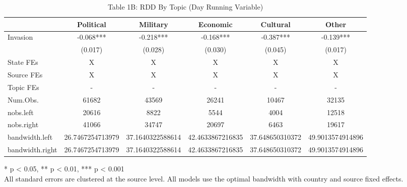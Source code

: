 \begin{table}[!t]
\caption{Table 1B: RDD By Topic (Day Running Variable)} 
\fontsize{12.0pt}{14.4pt}\selectfont
\begin{tabular*}{\linewidth}{@{\extracolsep{\fill}}lccccc}
\toprule
  & Political & Military & Economic & Cultural & Other \\ 
\midrule\addlinespace[2.5pt]
Invasion & -0.068*** & -0.218*** & -0.168*** & -0.387*** & -0.139*** \\ 
{} & {(0.017)} & {(0.028)} & {(0.030)} & {(0.045)} & {(0.017)} \\ 
State FEs & X & X & X & X & X \\ 
Source FEs & X & X & X & X & X \\ 
Topic FEs & - & - & - & - & - \\ 
Num.Obs. & 61682 & 43569 & 26241 & 10467 & 32135 \\ 
nobs.left & 20616 & 8822 & 5544 & 4004 & 12518 \\ 
nobs.right & 41066 & 34747 & 20697 & 6463 & 19617 \\ 
bandwidth.left & 26.7467254713979 & 37.1640322588614 & 42.4633867216835 & 37.648650310372 & 49.9013574914896 \\ 
bandwidth.right & 26.7467254713979 & 37.1640322588614 & 42.4633867216835 & 37.648650310372 & 49.9013574914896 \\ 
\bottomrule
\end{tabular*}
\begin{minipage}{\linewidth}
* p < 0.05, ** p < 0.01, *** p < 0.001\\
All standard errors are clustered at the source level. All models use the
optimal bandwidth with country and source fixed effects.\\
\end{minipage}
\end{table}

